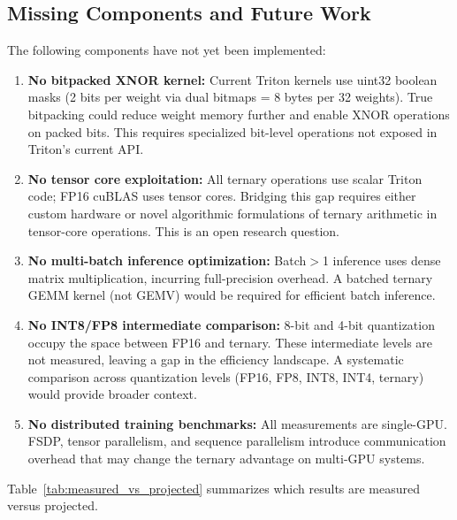 \documentclass{article}
\begin{document}
\subsection{Missing Components and Future Work}

The following components have not yet been implemented:

\begin{enumerate}
\item \textbf{No bitpacked XNOR kernel:} Current Triton kernels use uint32 boolean masks (2 bits per weight via dual bitmaps = 8 bytes per 32 weights). True bitpacking could reduce weight memory further and enable XNOR operations on packed bits. This requires specialized bit-level operations not exposed in Triton's current API.

\item \textbf{No tensor core exploitation:} All ternary operations use scalar Triton code; FP16 cuBLAS uses tensor cores. Bridging this gap requires either custom hardware or novel algorithmic formulations of ternary arithmetic in tensor-core operations. This is an open research question.

\item \textbf{No multi-batch inference optimization:} Batch$>$1 inference uses dense matrix multiplication, incurring full-precision overhead. A batched ternary GEMM kernel (not GEMV) would be required for efficient batch inference.

\item \textbf{No INT8/FP8 intermediate comparison:} 8-bit and 4-bit quantization occupy the space between FP16 and ternary. These intermediate levels are not measured, leaving a gap in the efficiency landscape. A systematic comparison across quantization levels (FP16, FP8, INT8, INT4, ternary) would provide broader context.

\item \textbf{No distributed training benchmarks:} All measurements are single-GPU. FSDP, tensor parallelism, and sequence parallelism introduce communication overhead that may change the ternary advantage on multi-GPU systems.
\end{enumerate}

Table~\ref{tab:measured_vs_projected} summarizes which results are measured versus projected.
\end{document}
